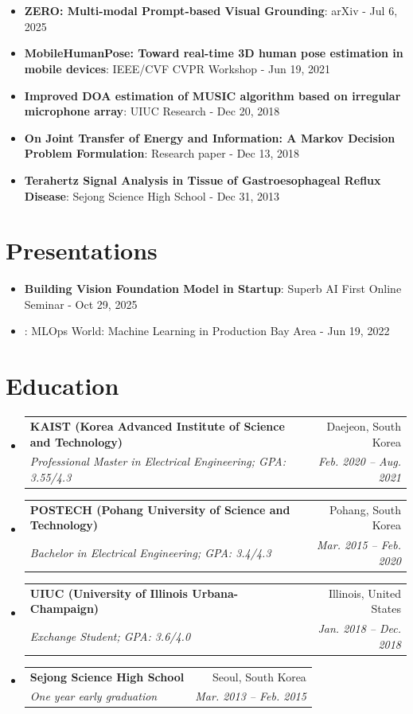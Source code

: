 \documentclass[letterpaper,11pt]{article}
\makeatletter
\newcommand{\MYhref}[3][blue]{\href{#2}{\color{#1}{#3}}}
\newcommand{\resumeItem}[2]{
  \item\small{
    \textbf{#1}{: #2 \vspace{-2pt}}
  }
}
\newcommand{\resumeSubheading}[4]{
  \vspace{-1pt}\item
    \begin{tabular*}{0.97\textwidth}{l@{\extracolsep{\fill}}r}
      \textbf{#1} & #2 \\
      \textit{\small#3} & \textit{\small #4} \\
    \end{tabular*}\vspace{-5pt}
}
\newcommand{\resumeSubItem}[2]{\resumeItem{#1}{#2}\vspace{-4pt}}
\newcommand{\resumeSubHeadingListStart}{\begin{itemize}[leftmargin=*]}
\newcommand{\resumeSubHeadingListEnd}{\end{itemize}}
\makeatother
\begin{document}
\section{\MYhref{https://scholar.google.co.kr/citations?user=4klHsscAAAAJ&hl=ko}{Papers}}
  \resumeSubHeadingListStart
    \resumeSubItem{ZERO: Multi-modal Prompt-based Visual Grounding}
      {arXiv - Jul 6, 2025}
    \resumeSubItem{MobileHumanPose: Toward real-time 3D human pose estimation in mobile devices}
      {IEEE/CVF CVPR Workshop - Jun 19, 2021}
    \resumeSubItem{Improved DOA estimation of MUSIC algorithm based on irregular microphone array}
      {UIUC Research - Dec 20, 2018}
    \resumeSubItem{On Joint Transfer of Energy and Information: A Markov Decision Problem Formulation}
      {Research paper - Dec 13, 2018}
    \resumeSubItem{Terahertz Signal Analysis in Tissue of Gastroesophageal Reflux Disease}
      {Sejong Science High School - Dec 31, 2013}
  \resumeSubHeadingListEnd

\section{Presentations}
  \resumeSubHeadingListStart
    \resumeSubItem{Building Vision Foundation Model in Startup}
      {Superb AI First Online Seminar - Oct 29, 2025}
    \resumeSubItem{\MYhref{https://events.ringcentral.com/events/mlops-world-machine-learning-in-production-bay-area/registration}{Automation in AutoLabeling}}
      {MLOps World: Machine Learning in Production Bay Area - Jun 19, 2022}
  \resumeSubHeadingListEnd

\section{Education}
  \resumeSubHeadingListStart
    \resumeSubheading
      {KAIST (Korea Advanced Institute of Science and Technology)}{Daejeon, South Korea}
      {Professional Master in Electrical Engineering; GPA: 3.55/4.3}{Feb. 2020 -- Aug. 2021}
    \resumeSubheading
      {POSTECH (Pohang University of Science and Technology)}{Pohang, South Korea}
      {Bachelor in Electrical Engineering; GPA: 3.4/4.3}{Mar. 2015 -- Feb. 2020}
    \resumeSubheading
      {UIUC (University of Illinois Urbana-Champaign)}{Illinois, United States}
      {Exchange Student; GPA: 3.6/4.0}{Jan. 2018 -- Dec. 2018}
    \resumeSubheading
      {Sejong Science High School}{Seoul, South Korea}
      {One year early graduation}{Mar. 2013 -- Feb. 2015}
  \resumeSubHeadingListEnd
\end{document}
